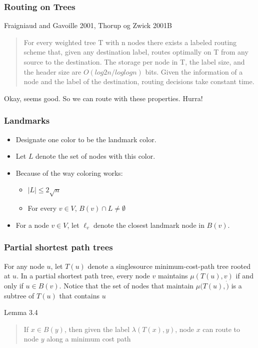 \documentclass[10pt, compress]{beamer}
\begin{document}
\begin{frame}[fragile]
  \frametitle{Routing on Trees}
    \begin{block}{Fraigniaud and Gavoille 2001, Thorup og Zwick 2001B}
        \begin{quote}
        For every weighted tree T with n nodes there exists a labeled routing
        scheme that, given any destination label, routes optimally on T from any
        source to the destination. The storage per node in T, the label size, and
        the header size are $O(log2 n/ log log n)$ bits. Given the information of
        a node and the label of the destination, routing decisions take constant
        time.
        \end{quote}
    \end{block}
    Okay, seems good. So we can route with these properties. Hurra!
\end{frame}

\begin{frame}[fragile]
  \frametitle{Landmarks}
  \begin{itemize}
    \item Designate one color to be the landmark color.
    \item Let $L$ denote the set of nodes with this color.
    \item Because of the way coloring works:
    \begin{itemize}
        \item $|L| \leq 2 \sqrt{n}$
        \item For every $v\in V$, $B(v)\cap L \neq \emptyset$
    \end{itemize}
    \item For a node $v\in V$, let $\ell_v$ denote the closest landmark node in $B(v)$.
  \end{itemize}
\end{frame}

\begin{frame}[fragile]
  \frametitle{Partial shortest path trees}
  For any node $u$, let $T(u)$ denote a singlesource minimum-cost-path tree
  rooted at $u$. In a partial shortest path tree, every node $v$ maintains
  $\mu(T(u),v)$ if and only if $u \in B(v)$. Notice that the set of nodes that
  maintain $\mu(T(u),\dot)$ is a subtree of $T(u)$ that contains $u$
  \begin{block}{Lemma 3.4}
    \begin{quote}
    If $x \in B(y)$, then given the label $\lambda(T(x), y)$, node $x$ can
    route to node $y$ along a minimum cost path
    \end{quote}
  \end{block}
\end{frame}
\end{document}
